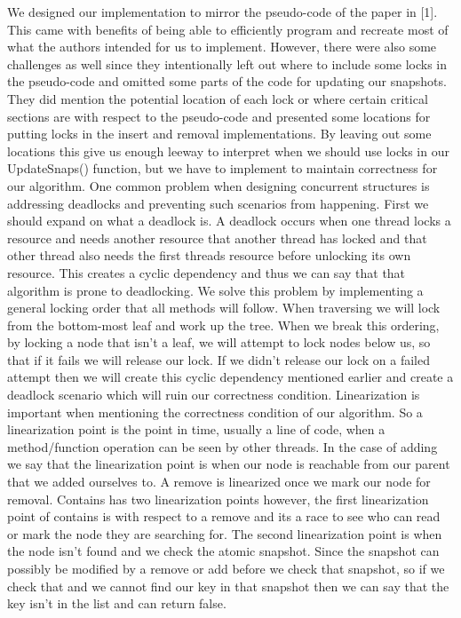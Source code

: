 \documentclass[conference]{IEEEtran}
\begin{document}
We designed our implementation to mirror the pseudo-code of the paper in [1]. This came with benefits of being able to efficiently program and recreate most of what the authors intended for us to implement. However, there were also some challenges as well since they intentionally left out where to include some locks in the pseudo-code and omitted some parts of the code for updating our snapshots. They did mention the potential location of each lock or where certain critical sections are with respect to the pseudo-code and presented some locations for putting locks in the insert and removal implementations. By leaving out some locations this give us enough leeway to interpret when we should use locks in our UpdateSnaps() function, but we have to implement to maintain correctness for our algorithm.
	One common problem when designing concurrent structures is addressing deadlocks and preventing such scenarios from happening. First we should expand on what a deadlock is. A deadlock occurs when one thread locks a resource and needs another resource that another thread has locked and that other thread also needs the first threads resource before unlocking its own resource. This creates a cyclic dependency and thus we can say that that algorithm is prone to deadlocking. We solve this problem by implementing a general locking order that all methods will follow. When traversing we will lock from the bottom-most leaf and work up the tree. When we break this ordering, by locking a node that isn't a leaf, we will attempt to lock nodes below us, so that if it fails we will release our lock. If we didn't release our lock on a failed attempt then we will create this cyclic dependency mentioned earlier and create a deadlock scenario which will ruin our correctness condition.
	Linearization is important when mentioning the correctness condition of our algorithm. So a linearization point is the point in time, usually a line of code, when a method/function operation can be seen by other threads. In the case of adding we say that the linearization point is when our node is reachable from our parent that we added ourselves to. A remove is linearized once we mark our node for removal. Contains has two linearization points however, the first linearization point of contains is with respect to a remove and its a race to see who can read or mark the node they are searching for. The second linearization point is when the node isn't found and we check the atomic snapshot. Since the snapshot can possibly be modified by a remove or add before we check that snapshot, so if we check that and we cannot find our key in that snapshot then we can say that the key isn't in the list and can return false.
\end{document}
